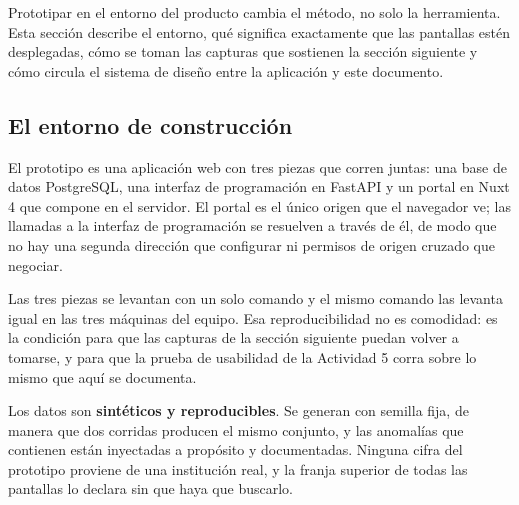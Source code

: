 %
%


Prototipar en el entorno del producto cambia el método, no solo la herramienta. Esta sección
describe el entorno, qué significa exactamente que las pantallas estén desplegadas, cómo se toman
las capturas que sostienen la sección siguiente y cómo circula el sistema de diseño entre la
aplicación y este documento.

\subsection{El entorno de construcción}

El prototipo es una aplicación web con tres piezas que corren juntas: una base de datos PostgreSQL,
una interfaz de programación en FastAPI y un portal en Nuxt 4 que compone en el servidor. El portal
es el único origen que el navegador ve; las llamadas a la interfaz de programación se resuelven a
través de él, de modo que no hay una segunda dirección que configurar ni permisos de origen cruzado
que negociar.

Las tres piezas se levantan con un solo comando y el mismo comando las levanta igual en las tres
máquinas del equipo. Esa reproducibilidad no es comodidad: es la condición para que las capturas de
la sección siguiente puedan volver a tomarse, y para que la prueba de usabilidad de la Actividad 5
corra sobre lo mismo que aquí se documenta.

Los datos son \textbf{sintéticos y reproducibles}. Se generan con semilla fija, de manera que dos
corridas producen el mismo conjunto, y las anomalías que contienen están inyectadas a propósito y
documentadas. Ninguna cifra del prototipo proviene de una institución real, y la franja superior de
todas las pantallas lo declara sin que haya que buscarlo.

